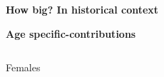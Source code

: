 \documentclass[xcolor={dvipsnames}]{beamer}
\begin{document}
\begin{frame}
\begin{center}

 \LARGE{\textbf{How big? In historical context}}
 
												

\end{center}
\end{frame}


\begin{frame}

\begin{center}
 \LARGE{\textbf{Age specific-contributions}}
\end{center}

\begin{columns}

\begin{column}{0.5\textwidth}
\begin{center}
\vspace*{-.8cm}
\LARGE{Females}\\
\end{center}
\end{column}


\end{columns}
\end{frame}
\end{document}
